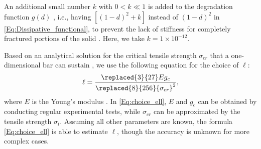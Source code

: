\begin{remark}
An additional small number $k$ with {$0<k\ll 1$} is added to the degradation function $g(d)$%
, i.e., having $[(1-d)^2+k]$ instead of $(1-d)^2$ in \eqref{Eq:Dissipative_functional}, to prevent the lack of stiffness for completely fractured portions of the solid \cite{Bourdin2000797}. Here, we take $k=1\times10^{-12}$.
\end{remark}
\begin{remark}\label{Re:4}
{Based on an analytical solution for the critical tensile strength $\sigma_{cr}$ that a one-dimensional bar can sustain \cite{Bourdin2014014301}, we use the following equation for the choice of $\ell$:}
\begin{equation}\label{Eq:choice_ell}
    \begin{aligned}
        \ell=\frac{\replaced{3}{27}Eg_c}{\replaced{8}{256}{\sigma_{cr}}^2},
    \end{aligned}
\end{equation}
where $E$ is the Young's modulus . In \eqref{Eq:choice_ell}, $E$ and $g_c$ can be obtained by conducting regular experimental tests, while $\sigma_{cr}$ can be approximated by the tensile strength $\sigma_t$. Assuming all {other} parameters are known, the formula \eqref{Eq:choice_ell} is able to estimate $\ell$, though the accuracy is unknown for more complex cases.
\end{remark}
